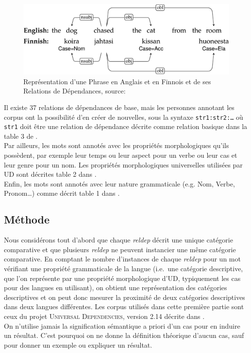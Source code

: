 \documentclass{cours}
\begin{document}
\begin{figure}
	\centering
	\includegraphics[width=\textwidth]{Figures/Visualisations/simplified_ud_annotation}
	\caption{Représentation d'une Phrase en Anglais et en Finnois et de ses Relations de Dépendances, source:\cite{UDv2}}
	\label{fig:ud_annot}
\end{figure}

Il existe 37 relations de dépendances de base, mais les personnes annotant les corpus ont la possibilité d'en créer de nouvelles, sous la syntaxe \texttt{str1:str2:\dots} où \texttt{str1} doit être une relation de dépendance décrite comme relation basique dans la table 3 de \cite{UDv2}.\\
Par ailleurs, les mots sont annotés avec les propriétés morphologiques qu'ils possèdent, par exemple leur temps ou leur aspect pour un verbe ou leur cas et leur genre pour un nom.
Les propriétés morphologiques universelles utilisées par UD sont décrites table 2 dans \cite{UDv2}.\\
Enfin, les mots sont annotés avec leur nature grammaticale (e.g. Nom, Verbe, Pronom\dots) comme décrit table 1 dans \cite{UDv2}.

\subsection{Méthode}\label{subsec:méthode}
Nous considérons tout d'abord que chaque \textit{reldep} décrit une unique catégorie comparative et que plusieurs \textit{reldep} ne peuvent instancier une même catégorie comparative.
En comptant le nombre d'instances de chaque \textit{reldep} pour un mot vérifiant une propriété grammaticale de la langue (i.e.\ une catégorie descriptive, que l'on représente par une propriété morphologique d'UD, typiquement les cas pour des langues en utilisant), on obtient une représentation des catégories descriptives et on peut donc mesurer la proximité de deux catégories descriptives dans deux langues différentes.
Les corpus utilisés dans cette première partie sont ceux du projet \textsc{Universal Dependencies}, version 2.14 décrite dans \cite{UD214}.\\
On n'utilise jamais la signification sémantique a priori d'un cas pour en induire un résultat. C'est pourquoi on ne donne la définition théorique d'aucun cas, sauf pour donner un exemple ou expliquer un résultat.
\end{document}
